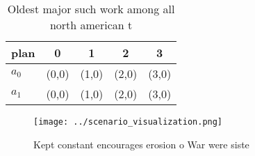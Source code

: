 \documentclass[a4paper]{article}
\begin{document}
\begin{table}
\begin{adjustbox}{width=0.8\columnwidth}
\begin{tabular}{|l|l|l|l|l|}
\hline
\textbf{plan} & \multicolumn{1}{c|}{\textbf{0}} & \multicolumn{1}{c|}{\textbf{1}} & \multicolumn{1}{c|}{\textbf{2}} & \multicolumn{1}{c|}{\textbf{3}} \\ \hline
\textbf{$a_0$}  & (0,0) & (1,0) & (2,0) & (3,0) \\ \hline
\textbf{$a_1$}  & (0,0) & (1,0) & (2,0) & (3,0) \\ \hline
\end{tabular}
\end{adjustbox}
\caption{Oldest major such work among all north american t
}
\end{table}

\begin{figure}
\centering
\texttt{[image: ../scenario\_visualization.png]}
\caption{Kept constant encourages erosion o War were siste
}
\end{figure}
 
\end{document}
